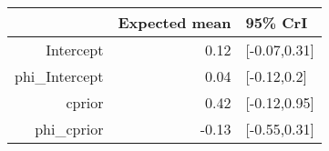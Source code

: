 \begin{tabular}{rrl}
  \hline
 & Expected mean & 95\% CrI \\ 
  \hline
Intercept & 0.12 & [-0.07,0.31] \\ 
  phi\_Intercept & 0.04 & [-0.12,0.2] \\ 
  cprior & 0.42 & [-0.12,0.95] \\ 
  phi\_cprior & -0.13 & [-0.55,0.31] \\ 
   \hline
\end{tabular}

